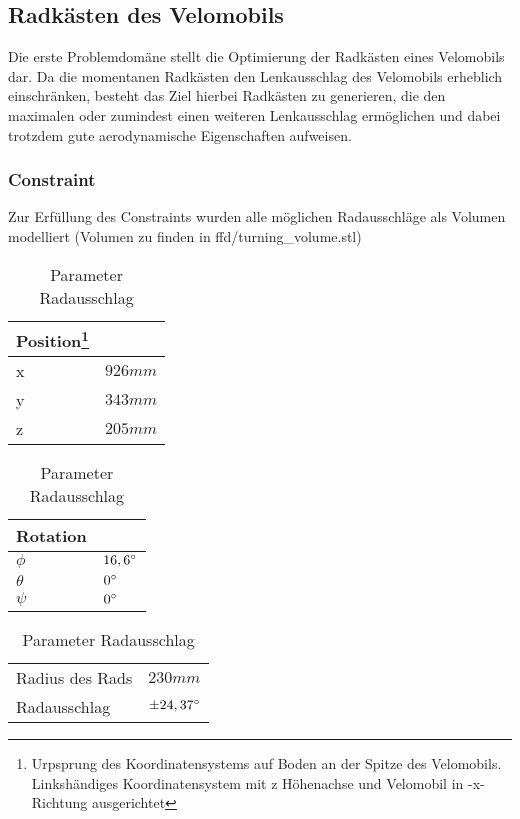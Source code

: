 \subsection{Radkästen des Velomobils}

Die erste Problemdomäne stellt die Optimierung der Radkästen eines Velomobils dar.
Da die momentanen Radkästen den Lenkausschlag des Velomobils erheblich einschränken, besteht das Ziel hierbei Radkästen zu generieren, die den maximalen oder zumindest einen weiteren Lenkausschlag ermöglichen und dabei trotzdem gute aerodynamische Eigenschaften aufweisen.

\subsubsection{Constraint}
Zur Erfüllung des Constraints wurden alle möglichen Radausschläge als Volumen modelliert (Volumen zu finden in ffd/turning\_volume.stl)

\begin{table}[h]
	\begin{tabularx}{.5\textwidth}{ll}\hline
		
		Position\footnote{Urpsprung des Koordinatensystems auf Boden an der Spitze des Velomobils. Linkshändiges Koordinatensystem mit z Höhenachse und Velomobil in -x-Richtung ausgerichtet} & \\
		\hline
		x &	$926mm$ \\
		y &	$343mm$ \\
		z &	$205mm$	\\
	\end{tabularx}
	\begin{tabularx}{.5\textwidth}{ll}\hline
		Rotation & \\ \hline
		$\phi$ & $16,6\degree$ \\
		$\theta$ & $0\degree$ \\
		$\psi$ & $0\degree$ \\
	\end{tabularx}
	\begin{tabularx}{.5\linewidth}{ll}
		Radius des Rads & $230mm$ \\
		
		Radausschlag & $\pm24,37\degree$\\
		
	\end{tabularx}

\label{tab:wheel_params}
\caption{Parameter Radausschlag}
\end{table}

